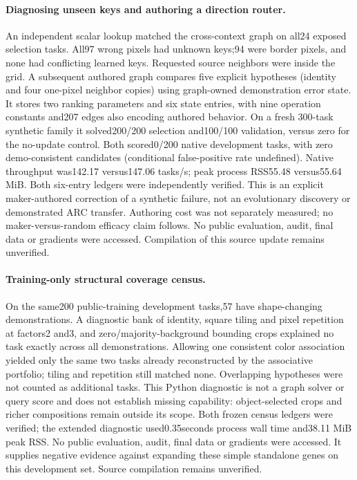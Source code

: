 \documentclass[11pt]{article}
\begin{document}
\paragraph{Diagnosing unseen keys and authoring a direction router.}
An independent scalar lookup matched the cross-context graph on all24 exposed
selection tasks. All97 wrong pixels had unknown keys;94 were border pixels,
and none had conflicting learned keys. Requested source neighbors were inside
the grid. A subsequent authored graph compares five explicit hypotheses
(identity and four one-pixel neighbor copies) using graph-owned demonstration
error state. It stores two ranking parameters and six state entries, with nine
operation constants and207 edges also encoding authored behavior. On a fresh
300-task synthetic family it solved200/200 selection and100/100 validation,
versus zero for the no-update control. Both scored0/200 native development
tasks, with zero demo-consistent candidates (conditional false-positive rate
undefined). Native throughput was142.17 versus147.06 tasks/s; peak process
RSS55.48 versus55.64 MiB. Both six-entry ledgers were independently verified.
This is an explicit maker-authored correction of a synthetic failure, not an
evolutionary discovery or demonstrated ARC transfer. Authoring cost was not
separately measured; no maker-versus-random efficacy claim follows. No public
evaluation, audit, final data or gradients were accessed. Compilation of this
source update remains unverified.
\paragraph{Training-only structural coverage census.}
On the same200 public-training development tasks,57 have shape-changing
demonstrations. A diagnostic bank of identity, square tiling and pixel repetition
at factors2 and3, and zero/majority-background bounding crops explained no task
exactly across all demonstrations. Allowing one consistent color association
yielded only the same two tasks already reconstructed by the associative
portfolio; tiling and repetition still matched none. Overlapping hypotheses
were not counted as additional tasks. This Python diagnostic is not a graph
solver or query score and does not establish missing capability: object-selected
crops and richer compositions remain outside its scope. Both frozen census
ledgers were verified; the extended diagnostic used0.35seconds process wall
time and38.11 MiB peak RSS. No public evaluation, audit, final data or gradients
were accessed. It supplies negative evidence against expanding these simple
standalone genes on this development set. Source compilation remains unverified.
\end{document}
